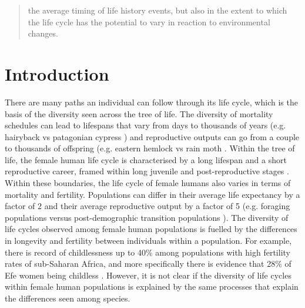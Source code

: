 \documentclass{article}
\begin{document}
\begin{abstract}
the average timing of life history events, but also in the extent to which the life cycle has the potential to vary in reaction to environmental changes.
\end{abstract}

\section{Introduction}

There are many paths an individual can follow through its life cycle, which is the basis of the diversity seen across the tree of life. The diversity of mortality schedules can lead to lifespans that vary from days to thousands of years (e.g. hairyback vs patagonian cypress \citep{balsamo1988life,lara19933620}) and reproductive outputs can go from a couple to thousands of offspring (e.g. eastern hemlock vs rain moth \citep{tindale1932revision,van2017lifetime}. Within the tree of life, the female human life cycle is characterised by a long lifespan and a short reproductive career, framed within long juvenile and post-reproductive stages \citep{kaplan2000theory}. Within these boundaries, the life cycle of female humans also varies in terms of mortality and fertility. Populations can differ in their average life expectancy by a factor of 2 and their average reproductive output by a factor of 5 (e.g. foraging populations \citep{migliano2007life} versus post-demographic transition populations \citep{de2017maximum}). The diversity of life cycles observed among female human populations is fuelled by the differences in longevity and fertility between individuals within a population. For example, there is record of childlessness up to 40\% among populations with high fertility rates of sub-Saharan Africa, and more specifically there is evidence that 28\% of Efe women being childless \citep{bailey1995sexuality,belsey1976epidemiology}. However, it is not clear if the diversity of life cycles within female human populations is explained by the same processes that explain the differences seen among species. 
\end{document}
